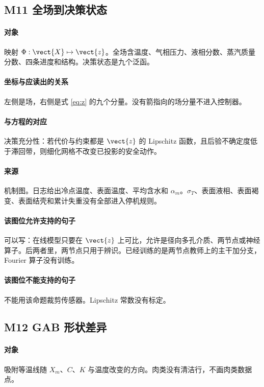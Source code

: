 \subsection{M11 全场到决策状态}
\paragraph{对象}
映射 $\Phi:\vect{X}\mapsto\vect{z}$。全场含温度、气相压力、液相分数、蒸汽质量分数、四条进度和结构。决策状态是九个泛函。

\paragraph{坐标与应读出的关系}
左侧是场，右侧是式 \eqref{eq:z} 的九个分量。没有箭指向的场分量不进入控制器。

\paragraph{与方程的对应}
决策充分性：若代价与约束都是 $\vect{z}$ 的 Lipschitz 函数，且后验不确定度低于滞回带，则细化网格不改变已投影的安全动作。

\paragraph{来源}
机制图。日志给出冷点温度、表面温度、平均含水和 $\alpha_m$。$\sigma_T$、表面液相、表面褐变、表面结壳和累计失重没有全部进入停机规则。

\paragraph{该图位允许支持的句子}
可以写：在线模型只要在 $\vect{z}$ 上可比，允许是径向多孔介质、两节点或神经算子。后两者里，两节点只用于辨识。已经训练的是两节点教师上的主干加分支，Fourier 算子没有训练。

\paragraph{该图位不能支持的句子}
不能用该命题裁剪传感器。Lipschitz 常数没有标定。

\subsection{M12 GAB 形状差异}
\paragraph{对象}
吸附等温线随 $X_m$、$C$、$K$ 与温度改变的方向。肉类没有清洁行，不画肉类数据点。


